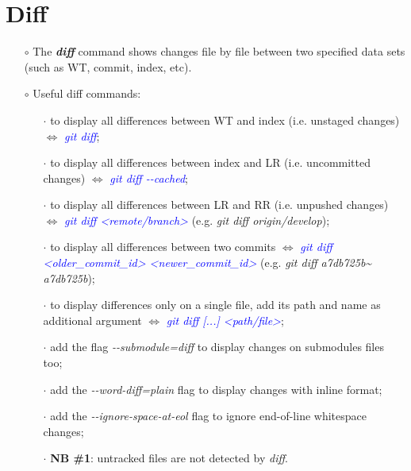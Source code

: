 \documentclass[a4paper,portrait,10pt]{article}   %
\newcommand{\mybulletlvA}{$\circ$}   %
\newcommand{\mybulletlvB}{$\cdot$}   %
\newcommand{\mydiv}{$\Leftrightarrow$ }   %
\newcommand{\mycmd}[1]{\textcolor{blue}{\textit{#1}}}   %
\newcommand{\myparvspace}{\vspace{4mm}}   %
\newcommand{\mysecvspace}{\vspace{6mm}}   %
\begin{document}

\section{Diff}   \label{sec:Diff}

\begin{itemize}
\item[\mybulletlvA] The \textbf{\textit{diff}} command shows changes file by file between two specified data sets (such as WT, commit, index, etc).
\myparvspace

\item[\mybulletlvA] Useful diff commands:
\begin{itemize}
  \item[\mybulletlvB] to display all differences between WT and index (i.e. unstaged changes) \mydiv \mycmd{git diff};
  \item[\mybulletlvB] to display all differences between index and LR (i.e. uncommitted changes) \mydiv \mycmd{git diff -{}-cached};
  \item[\mybulletlvB] to display all differences between LR and RR (i.e. unpushed changes) \mydiv \mycmd{git diff <remote/branch>} (e.g. \textit{git diff origin/develop});
  \item[\mybulletlvB] to display all differences between two commits \mydiv \mycmd{git diff <older\_commit\_id> <newer\_commit\_id>} (e.g. \textit{git diff a7db725b\textasciitilde{} a7db725b});
  \item[\mybulletlvB] to display differences only on a single file, add its path and name as additional argument \mydiv \mycmd{git diff [...] <path/file>};
  \item[\mybulletlvB] add the flag \textit{-{}-submodule=diff} to display changes on submodules files too;
  \item[\mybulletlvB] add the \textit{-{}-word-diff=plain} flag to display changes with inline format;
  \item[\mybulletlvB] add the \textit{-{}-ignore-space-at-eol} flag to ignore end-of-line whitespace changes;
  \item[\mybulletlvB] \textbf{NB \#1}: untracked files are not detected by \textit{diff}.
\end{itemize}
\end{itemize}
\mysecvspace

\end{document}
